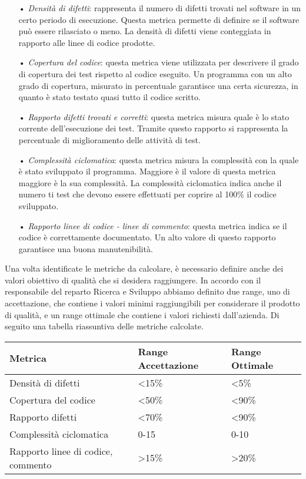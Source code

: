 \begin{itemize}
\item[•] \textit{Densità di difetti}: rappresenta il numero di difetti trovati nel software in un certo periodo di esecuzione. Questa metrica permette di definire se il software può essere rilasciato o meno. La densità di difetti viene conteggiata in rapporto alle linee di codice prodotte. 

\item[•] \textit{Copertura del codice}: questa metrica viene utilizzata per descrivere il grado di copertura dei test rispetto al codice eseguito. Un programma con un alto grado di copertura, misurato in percentuale garantisce una certa sicurezza, in quanto è stato testato quasi tutto il codice scritto. 

\item[•] \textit{Rapporto difetti trovati e corretti}: questa metrica misura quale è lo stato corrente dell'esecuzione dei test. Tramite questo rapporto si rappresenta la percentuale di miglioramento delle attività di test.

\item[•] \textit{Complessità ciclomatica}: questa metrica misura la complessità con la quale è stato sviluppato il programma. Maggiore è il valore di questa metrica maggiore è la sua complessità. La complessità ciclomatica indica anche il numero ti test che devono essere effettuati per coprire al 100\% il codice sviluppato.

\item[•] \textit{Rapporto linee di codice - linee di commento}: questa metrica indica se il codice è correttamente documentato. Un alto valore di questo rapporto garantisce una buona manutenibilità.
\end{itemize}


Una volta identificate le metriche da calcolare, è necessario definire anche dei valori obiettivo di qualità che si desidera raggiungere. In accordo con il responsabile del reparto Ricerca e Sviluppo abbiamo definito due range, uno di accettazione, che contiene i valori minimi raggiungibili per considerare il prodotto di qualità, e un range ottimale che contiene i valori richiesti dall'azienda. Di seguito una tabella riassuntiva delle metriche calcolate.
\bigskip

\begin{tabular}{|l l l|}
\hline
Metrica	& Range Accettazione	& Range Ottimale \\
\hline
Densità di difetti & <15\% & <5\% \\
Copertura del codice & <50\% & <90\% \\
Rapporto difetti & <70\% & <90\% \\
Complessità ciclomatica & 0-15 & 0-10 \\
Rapporto linee di codice, commento  & >15\% & >20\% \\
\hline
\end{tabular}

